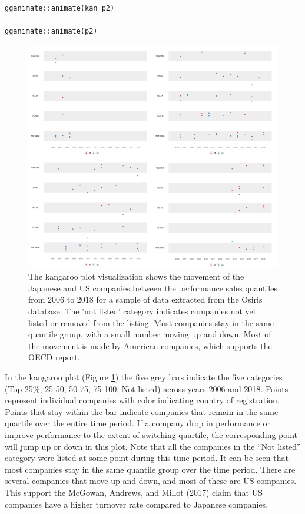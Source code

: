\begin{verbatim}
gganimate::animate(kan_p2)

gganimate::animate(p2)
\end{verbatim}

\begin{figure}

{\centering \includegraphics[width=1\linewidth]{figures/osiris} 

}

\caption{The kangaroo plot visualization shows the movement of the Japanese and US companies between the performance sales quantiles from 2006 to 2018 for a sample of data extracted from the Osiris database. The 'not listed' category indicates companies not yet listed or removed from the listing. Most companies stay in the same quantile group, with a small number moving up and down. Most of the movement is made by American companies, which supports the OECD report.}\label{fig:kan-osiris-figure}
\end{figure}

In the kangaroo plot (Figure \ref{fig:kan-osiris-figure}) the five grey bars indicate the five categories (Top 25\%, 25-50, 50-75, 75-100, Not listed) across years 2006 and 2018. Points represent individual companies with color indicating country of registration. Points that stay within the bar indicate companies that remain in the same quartile over the entire time period. If a company drop in performance or improve performance to the extent of switching quartile, the corresponding point will jump up or down in this plot. Note that all the companies in the ``Not listed'' category were listed at some point during this time period. It can be seen that most companies stay in the same quantile group over the time period. There are several companies that move up and down, and most of these are US companies. This support the McGowan, Andrews, and Millot (2017) claim that US companies have a higher turnover rate compared to Japanese companies.

